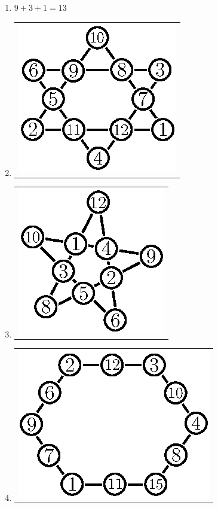 \begin{enumerate}
\item $9+3+1=13$

\item 
\begin{tabular}[c]{c}
\centering
\includegraphics{src/figures/ans23.eps}
\end{tabular}

\item 
\begin{tabular}[c]{c}
\centering
\includegraphics{src/figures/ans24.eps}
\end{tabular}

  

\item 
\begin{tabular}[c]{c}
\centering
\includegraphics{src/figures/ans25.eps}
\end{tabular}


\end{enumerate}
